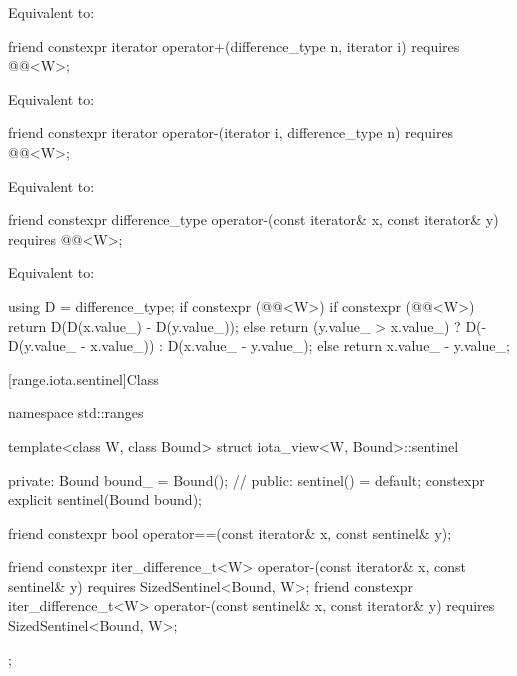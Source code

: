 \begin{itemdescr}
\pnum
\effects Equivalent to: 
\end{itemdescr}

\begin{itemdecl}
friend constexpr iterator operator+(difference_type n, iterator i)
  requires @@<W>;
\end{itemdecl}

\begin{itemdescr}
\pnum
\effects Equivalent to: 
\end{itemdescr}

\begin{itemdecl}
friend constexpr iterator operator-(iterator i, difference_type n)
  requires @@<W>;
\end{itemdecl}

\begin{itemdescr}
\pnum
\effects Equivalent to: 
\end{itemdescr}

\begin{itemdecl}
friend constexpr difference_type operator-(const iterator& x, const iterator& y)
  requires @@<W>;
\end{itemdecl}

\begin{itemdescr}
\pnum
\effects Equivalent to:
\begin{codeblock}
using D = difference_type;
if constexpr (@@<W>) {
  if constexpr (@@<W>)
    return D(D(x.value_) - D(y.value_));
  else
    return (y.value_ > x.value_)
      ? D(-D(y.value_ - x.value_))
      : D(x.value_ - y.value_);
} else {
  return x.value_ - y.value_;
}
\end{codeblock}
\end{itemdescr}

[range.iota.sentinel]{Class }

\begin{codeblock}
namespace std::ranges {
  template<class W, class Bound>
  struct iota_view<W, Bound>::sentinel {
  private:
    Bound bound_ = Bound();     // \expos
  public:
    sentinel() = default;
    constexpr explicit sentinel(Bound bound);

    friend constexpr bool operator==(const iterator& x, const sentinel& y);

    friend constexpr iter_difference_t<W> operator-(const iterator& x, const sentinel& y)
      requires SizedSentinel<Bound, W>;
    friend constexpr iter_difference_t<W> operator-(const sentinel& x, const iterator& y)
      requires SizedSentinel<Bound, W>;
  };
}
\end{codeblock}

